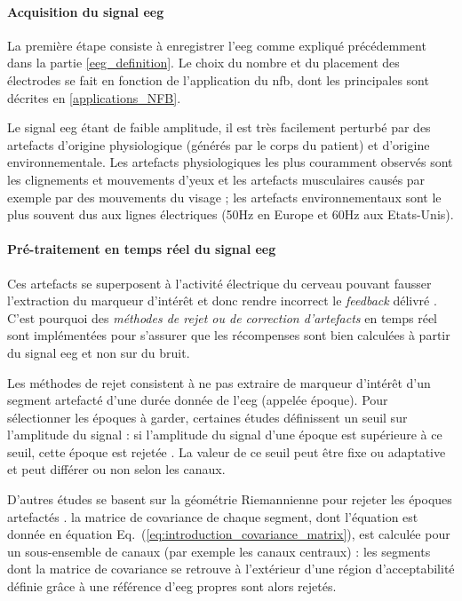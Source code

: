 \paragraph{Acquisition du signal \gls{eeg}}
La première étape consiste à enregistrer l'\gls{eeg} comme expliqué précédemment dans la partie \ref{eeg_definition}. Le choix
du nombre et du placement des électrodes se fait en fonction de l'application du \gls{nfb}, dont les principales sont décrites en
\ref{applications_NFB}. 

Le signal \gls{eeg} étant de faible amplitude, il est très facilement perturbé par des artefacts d'origine physiologique (générés par le
corps du patient) et d'origine environnementale. Les artefacts physiologiques les plus couramment observés sont les clignements et mouvements
d'yeux \citep{Iwasaki2005} et les artefacts musculaires \citep{Goncharova2003} causés par exemple par des mouvements du visage ; les artefacts environnementaux sont le plus souvent 
dus aux lignes électriques (50Hz en Europe et 60Hz aux Etats-Unis). 

\paragraph{Pré-traitement en temps réel du signal \gls{eeg}}
Ces artefacts se superposent à l'activité électrique du cerveau pouvant fausser l'extraction du marqueur d'intérêt et donc rendre
incorrect le \textit{feedback} délivré \citep{Enriquez2017, Montgomery2001, Sherlin2011, Paluch2017}. C'est pourquoi des \emph{méthodes de rejet ou de correction d'artefacts} en temps 
réel sont implémentées pour s'assurer que les récompenses sont bien calculées à partir du signal \gls{eeg} et non sur du bruit. 

Les méthodes de rejet consistent à ne pas extraire de marqueur d'intérêt d'un segment artefacté d'une durée donnée de l'\gls{eeg} (appelée époque). 
Pour sélectionner les époques à garder, certaines études définissent un seuil sur l'amplitude du signal : si l'amplitude du signal d'une époque est supérieure
à ce seuil, cette époque est rejetée \citep{Gevensleben2009, Heinrich2004}. La valeur de ce seuil peut être fixe ou adaptative et peut 
différer ou non selon les canaux. 

D'autres études se basent sur la géométrie Riemannienne pour rejeter les époques artefactés \citep{Barachant2013, Barthelemy2019, Bioulac2019}. 
la matrice de covariance de chaque segment, dont l'équation est donnée en équation Eq.~(\ref{eq:introduction_covariance_matrix}), est calculée pour un sous-ensemble de canaux (par exemple les canaux
centraux) : les segments dont la matrice de covariance se retrouve à l'extérieur d'une région d'acceptabilité définie grâce à une référence d'\gls{eeg} propres sont alors rejetés.


